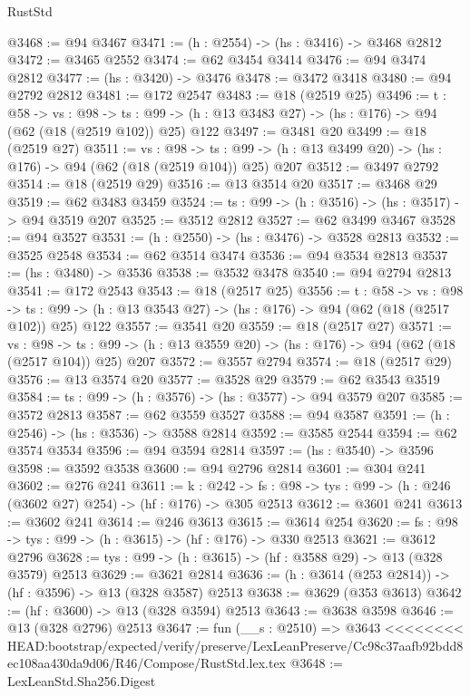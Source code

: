 \begin{lexlean}{RustStd}
\begin{coremodule}
{\begin{coremodule}
{{{{{{{{{@3468 := @94 @3467
@3471 := (h : @2554) -> (hs : @3416) -> @3468 @2812
@3472 := @3465 @2552
@3474 := @62 @3454 @3414
@3476 := @94 @3474 @2812
@3477 := (hs : @3420) -> @3476
@3478 := @3472 @3418
@3480 := @94 @2792 @2812
@3481 := @172 @2547
@3483 := @18 (@2519 @25)
@3496 := {t : @58} ->
  {vs : @98} ->
  {ts : @99} -> (h : @13 @3483 @27) -> (hs : @176) -> @94 (@62 (@18 (@2519 @102)) @25) @122
@3497 := @3481 @20
@3499 := @18 (@2519 @27)
@3511 := {vs : @98} ->
  {ts : @99} -> (h : @13 @3499 @20) -> (hs : @176) -> @94 (@62 (@18 (@2519 @104)) @25) @207
@3512 := @3497 @2792
@3514 := @18 (@2519 @29)
@3516 := @13 @3514 @20
@3517 := @3468 @29
@3519 := @62 @3483 @3459
@3524 := {ts : @99} -> (h : @3516) -> (hs : @3517) -> @94 @3519 @207
@3525 := @3512 @2812
@3527 := @62 @3499 @3467
@3528 := @94 @3527
@3531 := (h : @2550) -> (hs : @3476) -> @3528 @2813
@3532 := @3525 @2548
@3534 := @62 @3514 @3474
@3536 := @94 @3534 @2813
@3537 := (hs : @3480) -> @3536
@3538 := @3532 @3478
@3540 := @94 @2794 @2813
@3541 := @172 @2543
@3543 := @18 (@2517 @25)
@3556 := {t : @58} ->
  {vs : @98} ->
  {ts : @99} -> (h : @13 @3543 @27) -> (hs : @176) -> @94 (@62 (@18 (@2517 @102)) @25) @122
@3557 := @3541 @20
@3559 := @18 (@2517 @27)
@3571 := {vs : @98} ->
  {ts : @99} -> (h : @13 @3559 @20) -> (hs : @176) -> @94 (@62 (@18 (@2517 @104)) @25) @207
@3572 := @3557 @2794
@3574 := @18 (@2517 @29)
@3576 := @13 @3574 @20
@3577 := @3528 @29
@3579 := @62 @3543 @3519
@3584 := {ts : @99} -> (h : @3576) -> (hs : @3577) -> @94 @3579 @207
@3585 := @3572 @2813
@3587 := @62 @3559 @3527
@3588 := @94 @3587
@3591 := (h : @2546) -> (hs : @3536) -> @3588 @2814
@3592 := @3585 @2544
@3594 := @62 @3574 @3534
@3596 := @94 @3594 @2814
@3597 := (hs : @3540) -> @3596
@3598 := @3592 @3538
@3600 := @94 @2796 @2814
@3601 := @304 @241
@3602 := @276 @241
@3611 := {k : @242} ->
  {fs : @98} -> {tys : @99} -> (h : @246 (@3602 @27) @254) -> (hf : @176) -> @305 @2513
@3612 := @3601 @241
@3613 := @3602 @241
@3614 := @246 @3613
@3615 := @3614 @254
@3620 := {fs : @98} -> {tys : @99} -> (h : @3615) -> (hf : @176) -> @330 @2513
@3621 := @3612 @2796
@3628 := {tys : @99} -> (h : @3615) -> (hf : @3588 @29) -> @13 (@328 @3579) @2513
@3629 := @3621 @2814
@3636 := (h : @3614 (@253 @2814)) -> (hf : @3596) -> @13 (@328 @3587) @2513
@3638 := @3629 (@353 @3613)
@3642 := (hf : @3600) -> @13 (@328 @3594) @2513
@3643 := @3638 @3598
@3646 := @13 (@328 @2796) @2513
@3647 := fun (__s : @2510) => @3643
<<<<<<<< HEAD:bootstrap/expected/verify/preserve/LexLeanPreserve/Cc98c37aafb92bdd8ec108aa430da9d06/R46/Compose/RustStd.lex.tex
@3648 := LexLeanStd.Sha256.Digest
}}}}}}}}}
\end{coremodule}}
\end{coremodule}
\end{lexlean}
